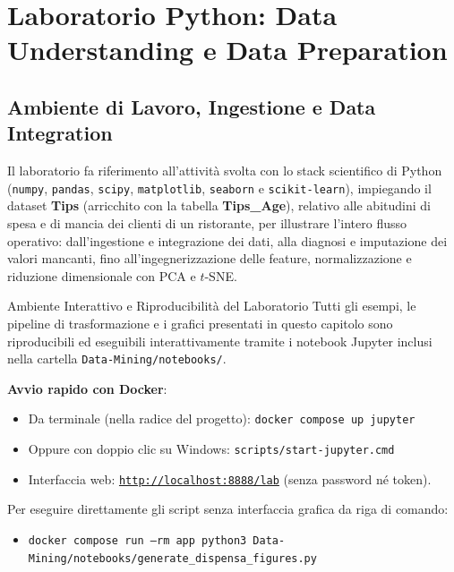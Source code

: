 \chapter{Laboratorio Python: Data Understanding e Data Preparation}
\label{chap:dm-python-lab-du-dp}

\FloatBarrier
\section{Ambiente di Lavoro, Ingestione e Data Integration}
\label{sec:dm-lab-ingestion-integration}

Il laboratorio fa riferimento all'attività svolta con lo stack scientifico di Python (\texttt{numpy}, \texttt{pandas}, \texttt{scipy}, \texttt{matplotlib}, \texttt{seaborn} e \texttt{scikit-learn}), impiegando il dataset \textbf{Tips} (arricchito con la tabella \textbf{Tips\_Age}), relativo alle abitudini di spesa e di mancia dei clienti di un ristorante, per illustrare l'intero flusso operativo: dall'ingestione e integrazione dei dati, alla diagnosi e imputazione dei valori mancanti, fino all'ingegnerizzazione delle feature, normalizzazione e riduzione dimensionale con PCA e $t$-SNE.

\begin{noteblock}{Ambiente Interattivo e Riproducibilità del Laboratorio}
    Tutti gli esempi, le pipeline di trasformazione e i grafici presentati in questo capitolo sono riproducibili ed eseguibili interattivamente tramite i notebook Jupyter inclusi nella cartella \texttt{Data-Mining/notebooks/}.
    
    \textbf{Avvio rapido con Docker}:
    \begin{itemize}[noitemsep]
        \item Da terminale (nella radice del progetto): \texttt{docker compose up jupyter}
        \item Oppure con doppio clic su Windows: \texttt{scripts/start-jupyter.cmd}
        \item Interfaccia web: \href{http://localhost:8888/lab}{\texttt{http://localhost:8888/lab}} (senza password né token).
    \end{itemize}
    Per eseguire direttamente gli script senza interfaccia grafica da riga di comando:
    \begin{itemize}[noitemsep]
        \item \texttt{docker compose run --rm app python3 Data-Mining/notebooks/generate\_dispensa\_figures.py}
    \end{itemize}
\end{noteblock}

